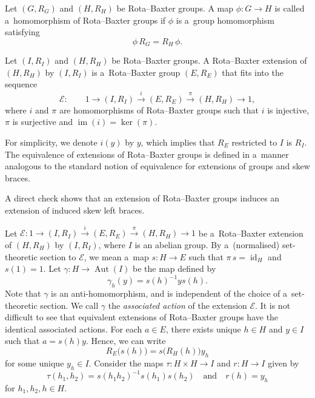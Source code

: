 \documentclass{jonasart}
\theoremstyle{plain}
\DeclareMathOperator{\Aut}{Aut}
\DeclareMathOperator{\Id}{id}
\DeclareMathOperator{\im}{im}
\begin{document}
	\begin{definition}
		Let $(G, R_{G})$ and $(H, R_{H})$ be Rota--Baxter groups. A map $\phi: G \rightarrow H$ is called a~homomorphism of Rota--Baxter groups if $\phi$ is a~group homomorphism satisfying
		\[
		\phi \, R_{G}=  R_{H} \, \phi.
		\]
	\end{definition}
	
	\begin{definition}
		Let $(I, R_I )$ and $(H, R_H )$ be Rota--Baxter groups. A Rota--Baxter extension of $(H, R_H )$ by $(I, R_I )$ is a~Rota--Baxter group $(E,R_E )$ that fits into the sequence
		\[
		\mathcal{E}: \quad \quad 1 \to (I,R_I) \stackrel{i}{\to}  (E,R_E) \stackrel{\pi}{\to} (H,R_H) \to 1,
		\]
		where $i$ and $\pi$ are homomorphisms of Rota--Baxter groups such that $i$ is injective, $\pi$ is surjective and $\im (i)=\ker(\pi)$.
	\end{definition}
	
	For simplicity, we denote $i(y)$ by $y$, which implies that $R_{E}$ restricted to $I$ is $R_I$. The equivalence of extensions of Rota--Baxter groups is defined in a~manner analogous to the standard notion of equivalence for extensions of groups and skew braces.
	
	\begin{remark}
		A direct check shows that an extension of Rota--Baxter groups induces an extension of induced skew left braces.
	\end{remark}
	
	Let $\mathcal{E}: 1 \to (I,R_I ) \stackrel{i}{\to} (E,R_E ) \stackrel{\pi}{\to} (H,R_H ) \to 1$ be a~Rota--Baxter extension of $(H, R_H )$ by $(I, R_I )$, where $I$ is an abelian group. By a~(normalised) set-theoretic section to $\mathcal{E}$, we mean a~map $s: H \rightarrow E$ such that $\pi \,s= \Id_{H}$ and $s(1)=1$. Let $\gamma:H \rightarrow \Aut(I)$ be the map defined by
	\[
	\gamma_h (y) = s(h)^{-1}y s(h).
	\]
	Note that $ \gamma$ is an anti-homomorphism, and is independent of the choice of a~set-theoretic section. We call $\gamma$ the \textit{associated action} of the extension $\mathcal{E}$. It is not difficult to see that equivalent extensions of Rota--Baxter groups have the identical associated actions. For each $a\in E$, there exists unique $h\in H$ and $y\in I$ such that $a=s(h)y$. Hence, we can write
	\begin{equation}
		R_E \big(s(h)\big)=s \big(R_H (h)\big)y_h
	\end{equation}
	for some unique $y_h\in I$. Consider the maps $\tau\colon H\times H\to I$ and $r\colon H\to I$ given by
	\[
	\tau(h_1,h_2) = s(h_1h_2)^{-1}s(h_1)s(h_2)
	\quad \text{and} \quad
	r(h) = y_h
	\]
	for $h_1, h_2, h \in H$.
	
\end{document}

